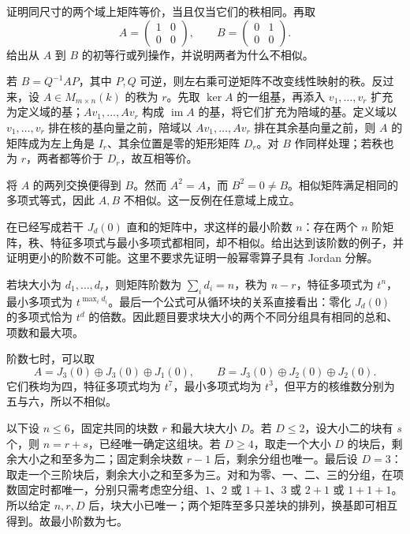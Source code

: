 \begin{exercise}\label{b2:ex:01-matrix-equivalence-rank}
	证明同尺寸的两个域上矩阵等价，当且仅当它们的秩相同。再取
	\[
		A=\begin{pmatrix}1&0\\0&0\end{pmatrix},\qquad
		B=\begin{pmatrix}0&1\\0&0\end{pmatrix}.
	\]
	给出从 \(A\) 到 \(B\) 的初等行或列操作，并说明两者为什么不相似。
\end{exercise}
\begin{solution}
	若 \(B=Q^{-1}AP\)，其中 \(P,Q\) 可逆，则左右乘可逆矩阵不改变线性映射的秩。反过来，设 \(A\in M_{m\times n}(k)\) 的秩为 \(r\)。先取 \(\ker A\) 的一组基，再添入 \(v_1,\ldots,v_r\) 扩充为定义域的基；\(Av_1,\ldots,Av_r\) 构成 \(\operatorname{im}A\) 的基，将它们扩充为陪域的基。定义域以 \(v_1,\ldots,v_r\) 排在核的基向量之前，陪域以 \(Av_1,\ldots,Av_r\) 排在其余基向量之前，则 \(A\) 的矩阵成为左上角是 \(I_r\)、其余位置是零的矩形矩阵 \(D_r\)。对 \(B\) 作同样处理；若秩也为 \(r\)，两者都等价于 \(D_r\)，故互相等价。

	将 \(A\) 的两列交换便得到 \(B\)。然而 \(A^2=A\)，而 \(B^2=0\ne B\)。相似矩阵满足相同的多项式等式，因此 \(A,B\) 不相似。这一反例在任意域上成立。
\end{solution}

\begin{exercise}\label{b2:ex:01-insufficient-invariants}
	在已经写成若干 \(J_d(0)\) 直和的矩阵中，求这样的最小阶数 \(n\)：存在两个 \(n\) 阶矩阵，秩、特征多项式与最小多项式都相同，却不相似。给出达到该阶数的例子，并证明更小的阶数不可能。这里不要求先证明一般幂零算子具有 Jordan 分解。
\end{exercise}
\begin{solution}
	若块大小为 \(d_1,\ldots,d_r\)，则矩阵阶数为 \(\sum_i d_i=n\)，秩为 \(n-r\)，特征多项式为 \(t^n\)，最小多项式为 \(t^{\max_i d_i}\)。最后一个公式可从循环块的关系直接看出：零化 \(J_d(0)\) 的多项式恰为 \(t^d\) 的倍数。因此题目要求块大小的两个不同分组具有相同的总和、项数和最大项。

	阶数七时，可以取
	\[
		A=J_3(0)\oplus J_3(0)\oplus J_1(0),\qquad B=J_3(0)\oplus J_2(0)\oplus J_2(0).
	\]
	它们秩均为四，特征多项式均为 \(t^7\)，最小多项式均为 \(t^3\)，但平方的核维数分别为五与六，所以不相似。

	以下设 \(n\le6\)，固定共同的块数 \(r\) 和最大块大小 \(D\)。若 \(D\le2\)，设大小二的块有 \(s\) 个，则 \(n=r+s\)，已经唯一确定这组块。若 \(D\ge4\)，取走一个大小 \(D\) 的块后，剩余大小之和至多为二；固定剩余块数 \(r-1\) 后，剩余分组也唯一。最后设 \(D=3\)：取走一个三阶块后，剩余大小之和至多为三。对和为零、一、二、三的分组，在项数固定时都唯一，分别只需考虑空分组、\(1\)、\(2\) 或 \(1+1\)、\(3\) 或 \(2+1\) 或 \(1+1+1\)。所以给定 \(n,r,D\) 后，块大小已唯一；两个矩阵至多只差块的排列，换基即可相互得到。故最小阶数为七。
\end{solution}

